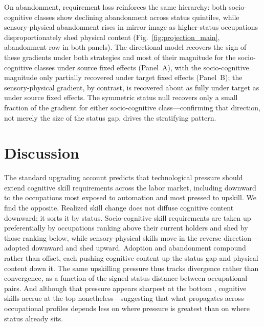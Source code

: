 \documentclass[11pt, letterpaper]{article} %
\newcommand{\parencite}[1]{\cite{#1}}
\begin{document}
On abandonment, requirement loss reinforces the same hierarchy: both socio-cognitive classes show declining abandonment across status quintiles, while sensory-physical abandonment rises in mirror image as higher-status occupations disproportionately shed physical content (Fig.~\ref{fig:projection_main}, abandonment row in both panels). The directional model recovers the sign of these gradients under both strategies and most of their magnitude for the socio-cognitive classes under source fixed effects (Panel~A), with the socio-cognitive magnitude only partially recovered under target fixed effects (Panel~B); the sensory-physical gradient, by contrast, is recovered about as fully under target as under source fixed effects. The symmetric status null recovers only a small fraction of the gradient for either socio-cognitive class---confirming that direction, not merely the size of the status gap, drives the stratifying pattern.



 
\section*{Discussion}

The standard upgrading account predicts that technological pressure should extend cognitive skill requirements across the labor market, including downward to the occupations most exposed to automation and most pressed to upskill. We find the opposite. Realized skill change does not diffuse cognitive content downward; it sorts it by status. Socio-cognitive skill requirements are taken up preferentially by occupations ranking above their current holders and shed by those ranking below, while sensory-physical skills move in the reverse direction—adopted downward and shed upward. Adoption and abandonment compound rather than offset, each pushing cognitive content up the status gap and physical content down it. The same upskilling pressure thus tracks divergence rather than convergence, as a function of the signed status distance between occupational pairs. And although that pressure appears sharpest at the bottom \parencite{tong_lower-skilled_2025, han_skill_2026}, cognitive skills accrue at the top nonetheless---suggesting that what propagates across occupational profiles depends less on where pressure is greatest than on where status already sits.
\end{document}
